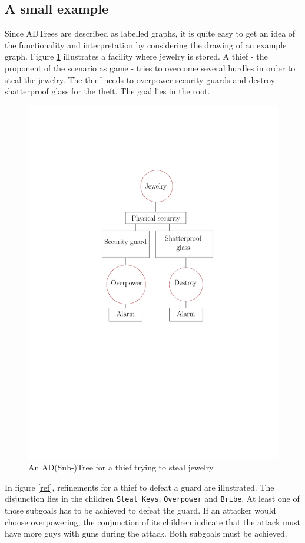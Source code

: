 \documentclass[conference]{IEEEtran}
\begin{document}
\subsection{A small example}
Since ADTrees are described as labelled graphs, it is quite easy to get an idea of the functionality and interpretation by considering the drawing of an example graph. Figure \ref{theft} illustrates a facility where jewelry is stored. A thief - the proponent of the scenario as game - tries to overcome several hurdles in order to steal the jewelry. The thief needs to overpower security guards and destroy shatterproof glass for the theft. The goal lies in the root.
\begin{figure}[htbp]
	\centering
		\centerline{\includegraphics[width=0.5\linewidth,page=1]{graphics.pdf}}
		\caption{An AD(Sub-)Tree for a thief trying to steal jewelry}
		\label{theft}
\end{figure}
In figure \ref{ref}, refinements for a thief to defeat a guard are illustrated. The disjunction lies in the children \texttt{Steal Keys}, \texttt{Overpower} and \texttt{Bribe}. At least one of those subgoals has to be achieved to defeat the guard. If an attacker would choose overpowering, the conjunction of its children indicate that the attack must have more guys with guns during the attack. Both subgoals must be achieved.
\end{document}
